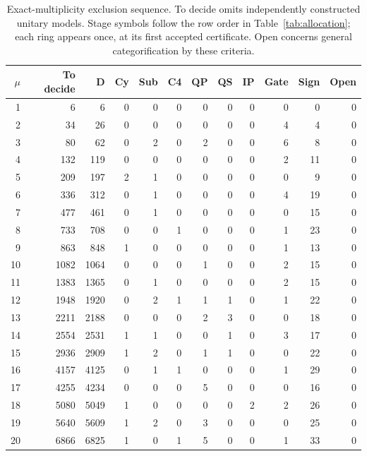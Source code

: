 \begin{table}[ht]\centering\small
\setlength{\tabcolsep}{2.5pt}
\begin{tabular}{r|r|rrrrrrrrr|r}\toprule
$\mu$&To decide&D&Cy&Sub&C4&QP&QS&IP&Gate&Sign&Open\\\midrule
1&6&6&0&0&0&0&0&0&0&0&0\\
2&34&26&0&0&0&0&0&0&4&4&0\\
3&80&62&0&2&0&2&0&0&6&8&0\\
4&132&119&0&0&0&0&0&0&2&11&0\\
5&209&197&2&1&0&0&0&0&0&9&0\\
6&336&312&0&1&0&0&0&0&4&19&0\\
7&477&461&0&1&0&0&0&0&0&15&0\\
8&733&708&0&0&1&0&0&0&1&23&0\\
9&863&848&1&0&0&0&0&0&1&13&0\\
10&1082&1064&0&0&0&1&0&0&2&15&0\\
11&1383&1365&0&1&0&0&0&0&2&15&0\\
12&1948&1920&0&2&1&1&1&0&1&22&0\\
13&2211&2188&0&0&0&2&3&0&0&18&0\\
14&2554&2531&1&1&0&0&1&0&3&17&0\\
15&2936&2909&1&2&0&1&1&0&0&22&0\\
16&4157&4125&0&1&1&0&0&0&1&29&0\\
17&4255&4234&0&0&0&5&0&0&0&16&0\\
18&5080&5049&1&0&0&0&0&2&2&26&0\\
19&5640&5609&1&2&0&3&0&0&0&25&0\\
20&6866&6825&1&0&1&5&0&0&1&33&0\\
\bottomrule\end{tabular}
\caption{Exact-multiplicity exclusion sequence. To decide omits independently constructed unitary models. Stage symbols follow the row order in Table~\ref{tab:allocation}; each ring appears once, at its first accepted certificate. Open concerns general categorification by these criteria.}\label{tab:stages}\end{table}
